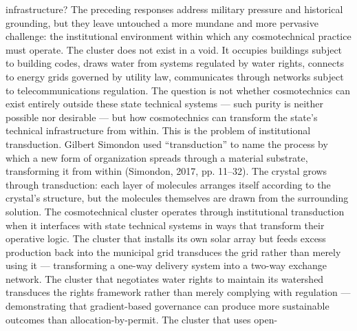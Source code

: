 infrastructure? The preceding responses address military pressure and historical grounding, but they leave untouched a more mundane and more pervasive challenge: the institutional environment within which any cosmotechnical practice must operate. The cluster does not exist in a void. It occupies buildings subject to building codes, draws water from systems regulated by water rights, connects to energy grids governed by utility law, communicates through networks subject to telecommunications regulation. The question is not whether cosmotechnics can exist entirely outside these state technical systems — such purity is neither possible nor desirable — but how cosmotechnics can transform the state’s technical infrastructure from within. This is the problem of institutional transduction. Gilbert Simondon used “transduction” to name the process by which a new form of organization spreads through a material substrate, transforming it from within (Simondon, 2017, pp. 11–32). The crystal grows through transduction: each layer of molecules arranges itself according to the crystal’s structure, but the molecules themselves are drawn from the surrounding solution. The cosmotechnical cluster operates through institutional transduction when it interfaces with state technical systems in ways that transform their operative logic. The cluster that installs its own solar array but feeds excess production back into the municipal grid transduces the grid rather than merely using it — transforming a one-way delivery system into a two-way exchange network. The cluster that negotiates water rights to maintain its watershed transduces the rights framework rather than merely complying with regulation — demonstrating that gradient-based governance can produce more sustainable outcomes than allocation-by-permit. The cluster that uses open-

